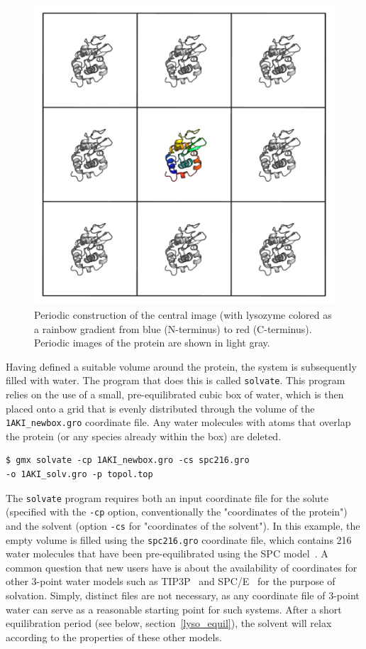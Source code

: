\documentclass[9pt,tutorial]{livecoms}
\begin{document}
\begin{figure}[h]
\centering
\includegraphics{1AKI_boxes}
\caption{Periodic construction of the central image (with lysozyme colored as a rainbow gradient from blue (N-terminus) to red (C-terminus). Periodic images of the protein are shown in light gray.}
\label{lyso_boxes_fig}
\end{figure}

Having defined a suitable volume around the protein, the system is subsequently filled with water. The program that does this is called \texttt{solvate}. This program relies on the use of a small, pre-equilibrated cubic box of water, which is then placed onto a grid that is evenly distributed through the volume of the \texttt{1AKI\_newbox.gro} coordinate file. Any water molecules with atoms that overlap the protein (or any species already within the box) are deleted.

\begin{verbatim}
$ gmx solvate -cp 1AKI_newbox.gro -cs spc216.gro 
-o 1AKI_solv.gro -p topol.top
\end{verbatim}

The \texttt{solvate} program requires both an input coordinate file for the solute (specified with the \texttt{-cp} option, conventionally the "coordinates of the protein") and the solvent (option \texttt{-cs} for "coordinates of the solvent"). In this example, the empty volume is filled using the \texttt{spc216.gro} coordinate file, which contains 216 water molecules that have been pre-equilibrated using the SPC model~\cite{Berendsen1981}. A common question that new users have is about the availability of coordinates for other 3-point water models such as TIP3P~\cite{Jorgensen1984} and SPC/E~\cite{Berendsen1987} for the purpose of solvation. Simply, distinct files are not necessary, as any coordinate file of 3-point water can serve as a reasonable starting point for such systems. After a short equilibration period (see below, section~\ref{lyso_equil}), the solvent will relax according to the properties of these other models.
\end{document}
